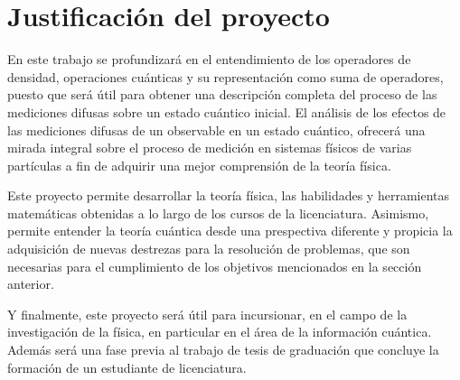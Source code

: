 \section{Justificación del proyecto}



En este trabajo se profundizará en el entendimiento de los operadores de densidad, operaciones cuánticas y su representación como suma de operadores, puesto que será útil para obtener una descripción completa del proceso de las mediciones difusas sobre un estado cuántico inicial. El análisis de los efectos de las mediciones difusas de un observable en un estado cuántico, ofrecerá una mirada integral sobre el proceso de medición en sistemas físicos de varias partículas a fin de adquirir una mejor comprensión de la teoría física.%

Este proyecto permite desarrollar la teoría física, las habilidades y herramientas matemáticas obtenidas a lo largo de los cursos de la licenciatura. Asimismo, permite entender la teoría cuántica desde una prespectiva diferente y propicia la adquisición de nuevas destrezas para la resolución de problemas, que son necesarias para el cumplimiento de los objetivos mencionados en la sección anterior.



 
  
  
 
  
 Y finalmente, este proyecto será útil para incursionar, en el campo de la investigación de la física, en particular en el área de la información cuántica. Además será una fase previa al trabajo de tesis de graduación que concluye la formación de un estudiante de licenciatura.    

